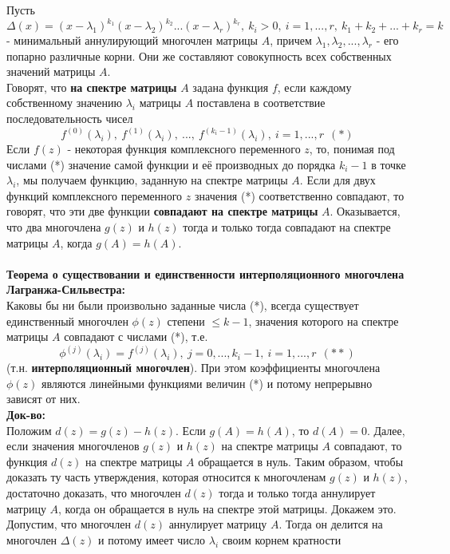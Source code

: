 \documentclass[14pt]{extarticle}
\begin{document}
Пусть $\Delta(x) = (x-\lambda_1)^{k_1} (x-\lambda_2)^{k_2} ... (x-\lambda_r)^{k_r}, 
\ k_i > 0, \ i = 1, ... , r, \ k_1 + k_2 + ... + k_r = k$ 
- минимальный аннулирующий многочлен матрицы $A$, причем 
$\lambda_1, \lambda_2, ... , \lambda_r$ - его попарно различные корни. 
Они же составляют совокупность всех собственных значений матрицы $A$. \\
Говорят, что \textbf{на спектре матрицы} $A$ задана функция $f$, если 
каждому собственному значению $\lambda_i$ матрицы $A$ поставлена в соответствие
последовательность чисел $$ f^{(0)} (\lambda_i), \ f^{(1)} (\lambda_i), \ ..., 
\ f^{(k_i - 1)} (\lambda_i), \ i = 1, ... , r \ \ (*)$$
Если $f(z)$ - некоторая функция комплексного переменного $z$, то, понимая 
под числами (*) значение самой функции и её производных до порядка $k_i - 1$
в точке $\lambda_i$, мы получаем функцию, заданную на спектре матрицы $A$. 
Если для двух функций комплексного переменного $z$ значения (*) соответственно 
совпадают, то говорят, что эти две функции \textbf{совпадают на спектре 
матрицы} $A$. Оказывается, что два многочлена $g(z)$ и $h(z)$ тогда и только 
тогда совпадают на спектре матрицы $A$, когда $g(A) = h(A)$.\\\\
\textbf{Теорема о существовании и единственности интерполяционного многочлена 
Лагранжа-Сильвестра:} \\
Каковы бы ни были произвольно заданные числа (*), 
всегда существует единственный многочлен $\phi(z)$ степени $\leq k - 1$, 
значения которого на спектре матрицы $A$ совпадают с числами (*), т.е. 
$$\phi^{(j)}(\lambda_i) = f^{(j)}(\lambda_i), \ j = 0, ... , k_i - 1, \
i = 1, ... , r \ \ (**)$$ (т.н. \textbf{интерполяционный многочлен}). 
При этом коэффициенты многочлена $\phi(z)$ являются
линейными функциями величин (*) и потому непрерывно зависят от них. \\
\textbf{Док-во:} \\
Положим $d(z) = g(z) - h(z)$. Если $g(A) = h(A)$,
то $d(A) = 0$. Далее, если значения многочленов $g(z)$ и $h(z)$ на спектре 
матрицы $A$ совпадают, то функция $d(z)$ на спектре матрицы $A$ обращается в нуль.
Таким образом, чтобы доказать ту часть утверждения, которая относится к 
многочленам $g(z)$ и $h(z)$, достаточно доказать, что многочлен $d(z)$ тогда 
и только тогда аннулирует матрицу $A$, когда он обращается в нуль на 
спектре этой матрицы. Докажем это. \\
Допустим, что многочлен $d(z)$ аннулирует матрицу $A$. Тогда он делится на 
многочлен $\Delta(z)$ и потому имеет число $\lambda_i$ своим корнем кратности 
\end{document}

